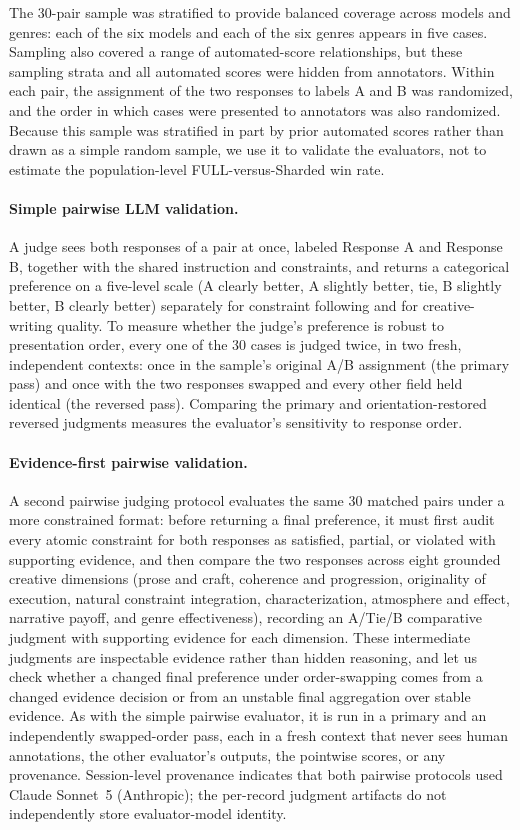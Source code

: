 The 30-pair sample was stratified to provide balanced coverage across models and genres: each of the six models and each of the six genres appears in five cases. Sampling also covered a range of automated-score relationships, but these sampling strata and all automated scores were hidden from annotators. Within each pair, the assignment of the two responses to labels A and B was randomized, and the order in which cases were presented to annotators was also randomized. Because this sample was stratified in part by prior automated scores rather than drawn as a simple random sample, we use it to validate the evaluators, not to estimate the population-level FULL-versus-Sharded win rate.

\paragraph{Simple pairwise LLM validation.} A judge sees both responses of a pair at once, labeled Response A and Response B, together with the shared instruction and constraints, and returns a categorical preference on a five-level scale (A clearly better, A slightly better, tie, B slightly better, B clearly better) separately for constraint following and for creative-writing quality. To measure whether the judge's preference is robust to presentation order, every one of the 30 cases is judged twice, in two fresh, independent contexts: once in the sample's original A/B assignment (the primary pass) and once with the two responses swapped and every other field held identical (the reversed pass). Comparing the primary and orientation-restored reversed judgments measures the evaluator's sensitivity to response order.

\paragraph{Evidence-first pairwise validation.} A second pairwise judging protocol evaluates the same 30 matched pairs under a more constrained format: before returning a final preference, it must first audit every atomic constraint for both responses as satisfied, partial, or violated with supporting evidence, and then compare the two responses across eight grounded creative dimensions (prose and craft, coherence and progression, originality of execution, natural constraint integration, characterization, atmosphere and effect, narrative payoff, and genre effectiveness), recording an A/Tie/B comparative judgment with supporting evidence for each dimension. These intermediate judgments are inspectable evidence rather than hidden reasoning, and let us check whether a changed final preference under order-swapping comes from a changed evidence decision or from an unstable final aggregation over stable evidence. As with the simple pairwise evaluator, it is run in a primary and an independently swapped-order pass, each in a fresh context that never sees human annotations, the other evaluator's outputs, the pointwise scores, or any provenance. Session-level provenance indicates that both pairwise protocols used Claude Sonnet~5 (Anthropic); the per-record judgment artifacts do not independently store evaluator-model identity.

